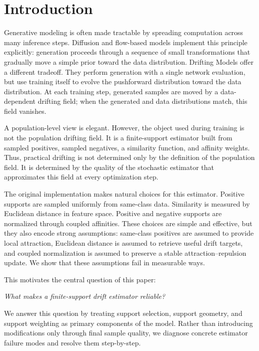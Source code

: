 \documentclass{article}
\begin{document}

\section{Introduction}
\label{sec:introduction}

Generative modeling is often made tractable by spreading computation across many inference steps.
Diffusion and flow-based models implement this principle explicitly: generation proceeds through a sequence of small transformations that gradually move a simple prior toward the data distribution.
Drifting Models offer a different tradeoff.
They perform generation with a single network evaluation, but use training itself to evolve the pushforward distribution toward the data distribution.
At each training step, generated samples are moved by a data-dependent drifting field; when the generated and data distributions match, this field vanishes.

A population-level view is elegant.
However, the object used during training is not the population drifting field.
It is a finite-support estimator built from sampled positives, sampled negatives, a similarity function, and affinity weights.
Thus, practical drifting is not determined only by the definition of the population field.
It is determined by the quality of the stochastic estimator that approximates this field at every optimization step.

The original implementation makes natural choices for this estimator.
Positive supports are sampled uniformly from same-class data.
Similarity is measured by Euclidean distance in feature space.
Positive and negative supports are normalized through coupled affinities.
These choices are simple and effective, but they also encode strong assumptions:
same-class positives are assumed to provide local attraction, Euclidean distance is assumed to retrieve useful drift targets, and coupled normalization is assumed to preserve a stable attraction--repulsion update.
We show that these assumptions fail in measurable ways.

This motivates the central question of this paper:
\begin{center}
\emph{What makes a finite-support drift estimator reliable?}
\end{center}

We answer this question by treating support selection, support geometry, and support weighting as primary components of the model.
Rather than introducing modifications only through final sample quality, we diagnose concrete estimator failure modes and resolve them step-by-step.
\end{document}

